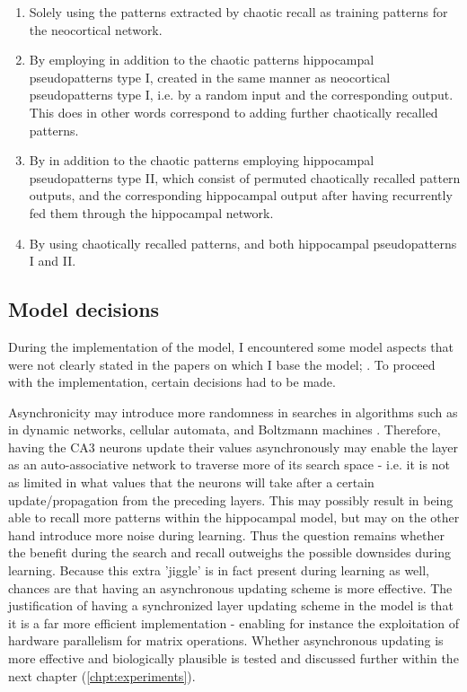 \begin{enumerate}
    \item Solely using the patterns extracted by chaotic recall as training patterns for the neocortical network.
    \item By employing in addition to the chaotic patterns hippocampal pseudopatterns type I, created in the same manner as neocortical pseudopatterns type I, i.e. by a random input and the corresponding output. This does in other words correspond to adding further chaotically recalled patterns.
    \item By in addition to the chaotic patterns employing hippocampal pseudopatterns type II, which consist of permuted chaotically recalled pattern outputs, and the corresponding hippocampal output after having recurrently fed them through the hippocampal network.
    \item By using chaotically recalled patterns, and both hippocampal pseudopatterns I and II.
\end{enumerate}


\subsection{Model decisions}

During the implementation of the model, I encountered some model aspects that were not clearly stated in the papers on which I base the model; \citep{Hattori2014, Hattori2010}. To proceed with the implementation, certain decisions had to be made.

Asynchronicity may introduce more randomness in searches in algorithms such as in dynamic networks, cellular automata, and Boltzmann machines \citep{Bar-yam1997}. Therefore, having the CA3 neurons update their values asynchronously may enable the layer as an auto-associative network to traverse more of its search space - i.e. it is not as limited in what values that the neurons will take after a certain update/propagation from the preceding layers. This may possibly result in being able to recall more patterns within the hippocampal model, but may on the other hand introduce more noise during learning. Thus the question remains whether the benefit during the search and recall outweighs the possible downsides during learning. Because this extra 'jiggle' is in fact present during learning as well, chances are that having an asynchronous updating scheme is more effective.
The justification of having a synchronized layer updating scheme in the model is that it is a far more efficient implementation - enabling for instance the exploitation of hardware parallelism for matrix operations. Whether asynchronous updating is more effective and biologically plausible is tested and discussed further within the next chapter (\ref{chpt:experiments}).
\\

